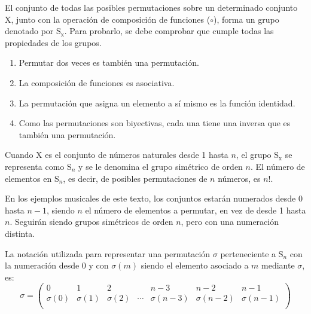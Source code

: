 		El conjunto de todas las posibles permutaciones sobre un determinado conjunto X, junto con la operación de composición de funciones ($\circ$), forma un grupo denotado por S$_\text{x}$. Para probarlo, se debe comprobar que cumple todas las propiedades de los grupos.

		\begin{enumerate}
			\item{Permutar dos veces es también una permutación.}
			\item{La composición de funciones es asociativa.}
			\item{La permutación que asigna un elemento a sí mismo es la función identidad.}
			\item{Como las permutaciones son biyectivas, cada una tiene una inversa que es también una permutación.}		
		\end{enumerate}

		Cuando X es el conjunto de números naturales desde 1 hasta $n$, el grupo S$_\text{x}$ se representa como S$_n$ y se le denomina el grupo simétrico de orden $n$. El número de elementos en S$_n$, es decir, de posibles permutaciones de $n$ números, es $n!$. 
		
		En los ejemplos musicales de este texto, los conjuntos estarán numerados desde 0 hasta $n-1$, siendo $n$ el número de elementos a permutar, en vez de desde 1 hasta $n$. Seguirán siendo grupos simétricos de orden $n$, pero con una numeración distinta.
		
		La notación utilizada para representar una permutación $\sigma$ perteneciente a S$_n$ con la numeración desde 0 y con $\sigma(m)$ siendo el elemento asociado a $m$ mediante $\sigma$, es:
		$$\sigma=\left(\begin{matrix}0&1&2&&n-3&n-2&n-1\\\sigma\left(0\right)&\sigma\left(1\right)&\sigma\left(2\right)&\cdots&\sigma\left(n-3\right)&\sigma\left(n-2\right)&\sigma\left(n-1\right)\\\end{matrix}\right)$$